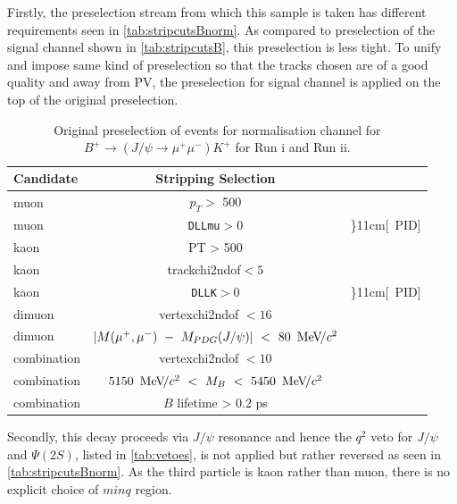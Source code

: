 Firstly, the preselection stream from which this sample is taken has different requirements seen in \autoref{tab:stripcutsBnorm}. As compared to preselection of the signal channel shown in \autoref{tab:stripcutsB}, this preselection is less tight. To unify and impose same kind of preselection so that the tracks chosen are of a good quality and away from \gls{PV}, the preselection for signal channel is applied on the top of the original preselection.


\begin{table}%
\begin{center}
\begin{tabular}{l|c l }

    \hline
     Candidate & Stripping Selection \\ \hline

	muon & $p_{T} >$ 500 \mev \\ 

	
	muon & \texttt{DLLmu}$ > 0$ & \rdelim\}{1}{1cm}[\ \gls{PID}] \\ \hline

	kaon & PT > 500 \mev \\ 
	kaon & \gls{trackchi2ndof}$ < 5$ \\
	kaon & \texttt{DLLK}$ > 0$ & \rdelim\}{1}{1cm}[\ \gls{PID}] \\ \hline

	dimuon & \gls{vertexchi2ndof} $< 16$ \\
	dimuon & $| M(\mu^{+},\mu^{-})\ -\ M_{PDG}(J/\psi)|\ <\ 80\ {\mathrm{\,Me\kern -0.1em V\!/}c^2}$ \\ \hline

	combination & \gls{vertexchi2ndof} $< 10$ \\
	combination & $5150\ \mevcc\ <\ M_B\ <\ 5450\ \mevcc$ \\
	combination & $B$ lifetime > 0.2 ps \\ \hline
     \end{tabular}

\end{center}
	\caption{Original preselection of events for normalisation channel for $B^{+} \rightarrow (J/\psi \rightarrow \mu^{+} \mu^{-}) K^{+}$ for Run \Rn{1} and Run \Rn{2}. }
\label{tab:stripcutsBnorm}
\end{table}


Secondly, this decay proceeds via $J/\psi$ resonance and hence the $q^{2}$ veto for $J/\psi$ and $\Psi{(2S)}$, listed in \autoref{tab:vetoes}, is not applied but rather reversed as seen in \autoref{tab:stripcutsBnorm}. As the third particle is kaon rather than muon, there is no explicit choice of $minq$ region.

